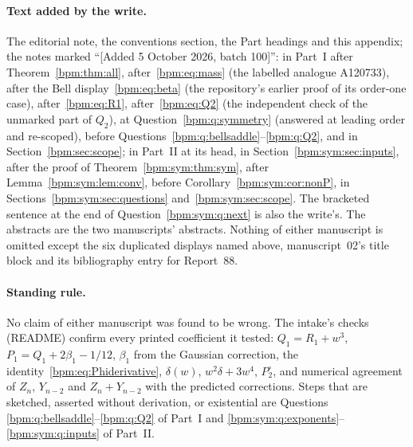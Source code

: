 \documentclass[11pt,a4paper]{article}
\theoremstyle{remark}\newtheorem{remark}[theorem]{Remark}%
\begin{document}
\paragraph{Text added by the write.} The editorial note, the conventions
section, the Part headings and this appendix; the notes marked ``[Added
5 October 2026, batch 100]'': in Part~I after Theorem~\ref{bpm:thm:all},
after~\eqref{bpm:eq:mass} (the labelled analogue A120733), after the Bell
display~\eqref{bpm:eq:beta} (the repository's earlier proof of its
order-one case), after~\eqref{bpm:eq:R1}, after~\eqref{bpm:eq:Q2} (the
independent check of the unmarked part of $Q_2$), at Question~\ref{bpm:q:symmetry}
(answered at leading order and re-scoped), before
Questions~\ref{bpm:q:bellsaddle}--\ref{bpm:q:Q2}, and in
Section~\ref{bpm:sec:scope}; in Part~II at its head, in
Section~\ref{bpm:sym:sec:inputs}, after the proof of
Theorem~\ref{bpm:sym:thm:sym}, after Lemma~\ref{bpm:sym:lem:conv}, before
Corollary~\ref{bpm:sym:cor:nonP}, in Sections~\ref{bpm:sym:sec:questions}
and~\ref{bpm:sym:sec:scope}. The bracketed sentence at the end of
Question~\ref{bpm:sym:q:next} is also the write's. The abstracts are the
two manuscripts' abstracts. Nothing of either manuscript is omitted except
the six duplicated displays named above, manuscript~02's title block and
its bibliography entry for Report~88.

\paragraph{Standing rule.} No claim of either manuscript was found to be
wrong. The intake's checks (README) confirm every printed coefficient it
tested: $Q_1=R_1+w^3$, $P_1=Q_1+2\beta_1-1/12$, $\beta_1$ from the Gaussian
correction, the identity~\eqref{bpm:eq:Phiderivative}, $\delta(w)$,
$w^2\delta+3w^4$, $P^\circ_2$, and numerical agreement of $Z_n$, $Y_{n-2}$
and $Z_n+Y_{n-2}$ with the predicted corrections. Steps that are sketched,
asserted without derivation, or existential are Questions
\ref{bpm:q:bellsaddle}--\ref{bpm:q:Q2} of Part~I and
\ref{bpm:sym:q:exponents}--\ref{bpm:sym:q:inputs} of Part~II.
\end{document}
